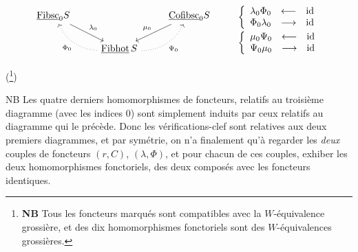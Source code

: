 \[
\begin{tikzcd}
\underline{\mathrm{Fibsc}}_0 S \arrow[dr, "\lambda_0"] & & \underline{\mathrm{Cofibsc}}_0 S \arrow[dl, "\mu_0"'] \\
& \ul{Fibhot}\,S \arrow[ul, dotted, bend left, "\Phi_0"] \arrow[ur, dotted, bend right, "\Psi_0"'] &
\end{tikzcd}
\qquad
\begin{array}{l}
\left\{\begin{array}{lcl}
\lambda_0\Phi_0 & \longleftarrow & \mathrm{id} \\
\Phi_0\lambda_0 & \longrightarrow & \mathrm{id}
\end{array}\right. \\[2ex]
\left\{\begin{array}{lcl}
\mu_0\Psi_0 & \longleftarrow & \mathrm{id} \\
\Psi_0\mu_0 & \longrightarrow & \mathrm{id}
\end{array}\right.
\end{array}
\]

(\footnote[40]{\textbf{NB} Tous les foncteurs marqués sont compatibles avec la $W$-équivalence grossière, et des dix homomorphismes fonctoriels sont des $W$-équivalences grossières.})

NB Les quatre derniers homomorphismes de foncteurs, relatifs au troisième diagramme (avec les indices 0) sont simplement induits par ceux relatifs au diagramme qui le précède. Donc les vérifications-clef sont relatives aux deux premiers diagrammes, et par symétrie, on n'a finalement qu'à regarder les \textit{deux} couples de foncteurs $(r,C)$, $(\lambda,\Phi)$, et pour chacun de ces couples, exhiber les deux homomorphismes fonctoriels, des deux composés avec les foncteurs identiques.



